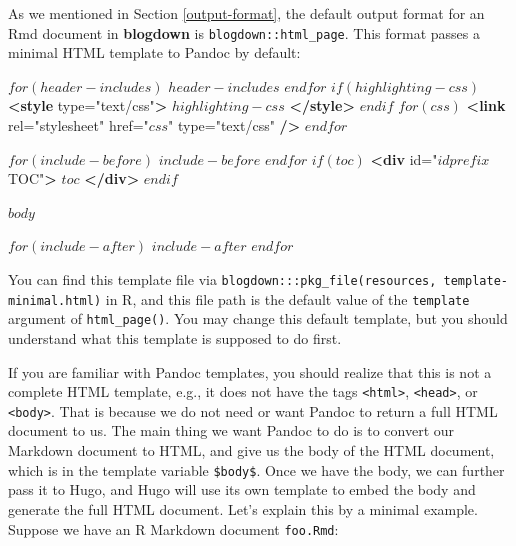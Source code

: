 \documentclass[12pt,]{krantz}
\makeatletter
\newenvironment{Shaded}{\begin{snugshade}}{\end{snugshade}}
\newcommand{\KeywordTok}[1]{\textcolor[rgb]{0.13,0.29,0.53}{\textbf{#1}}}
\newcommand{\StringTok}[1]{\textcolor[rgb]{0.31,0.60,0.02}{#1}}
\newcommand{\OtherTok}[1]{\textcolor[rgb]{0.56,0.35,0.01}{#1}}
\newcommand{\NormalTok}[1]{#1}
\newenvironment{kframe}{%
\medskip{}
\setlength{\fboxsep}{.8em}
 \def\at@end@of@kframe{}%
 \ifinner\ifhmode%
  \def\at@end@of@kframe{\end{minipage}}%
  \begin{minipage}{\columnwidth}%
 \fi\fi%
 \def\FrameCommand##1{\hskip\@totalleftmargin \hskip-\fboxsep
 \colorbox{shadecolor}{##1}\hskip-\fboxsep
     \hskip-\linewidth \hskip-\@totalleftmargin \hskip\columnwidth}%
 \MakeFramed {\advance\hsize-\width
   \@totalleftmargin\z@ \linewidth\hsize
   \@setminipage}}%
 {\par\unskip\endMakeFramed%
 \at@end@of@kframe}
\renewenvironment{Shaded}{\begin{kframe}}{\end{kframe}}
\theoremstyle{definition}
\theoremstyle{definition}
\theoremstyle{definition}
\theoremstyle{remark}
\makeatother
\begin{document}
As we mentioned in Section \ref{output-format}, the default output
format for an Rmd document in \textbf{blogdown} is
\texttt{blogdown::html\_page}. This format passes a minimal HTML
template to Pandoc by default:

\begin{Shaded}
\begin{Highlighting}[]
\NormalTok{$for(header-includes)$}
\NormalTok{$header-includes$}
\NormalTok{$endfor$}
\NormalTok{$if(highlighting-css)$}
\KeywordTok{<style}\OtherTok{ type=}\StringTok{"text/css"}\KeywordTok{>}
\NormalTok{$highlighting-css$}
\KeywordTok{</style>}
\NormalTok{$endif$}
\NormalTok{$for(css)$}
  \KeywordTok{<link}\OtherTok{ rel=}\StringTok{"stylesheet"}\OtherTok{ href=}\StringTok{"$css$"}\OtherTok{ type=}\StringTok{"text/css"} \KeywordTok{/>}
\NormalTok{$endfor$}

\NormalTok{$for(include-before)$}
\NormalTok{$include-before$}
\NormalTok{$endfor$}
\NormalTok{$if(toc)$}
\KeywordTok{<div}\OtherTok{ id=}\StringTok{"$idprefix$TOC"}\KeywordTok{>}
\NormalTok{$toc$}
\KeywordTok{</div>}
\NormalTok{$endif$}

\NormalTok{$body$}

\NormalTok{$for(include-after)$}
\NormalTok{$include-after$}
\NormalTok{$endfor$}
\end{Highlighting}
\end{Shaded}

You can find this template file via
\texttt{blogdown:::pkg\_file(\textquotesingle{}resources\textquotesingle{},\ \textquotesingle{}template-minimal.html\textquotesingle{})}
in R, and this file path is the default value of the \texttt{template}
argument of \texttt{html\_page()}. You may change this default template,
but you should understand what this template is supposed to do first.

If you are familiar with Pandoc templates, you should realize that this
is not a complete HTML template, e.g., it does not have the tags
\texttt{\textless{}html\textgreater{}},
\texttt{\textless{}head\textgreater{}}, or
\texttt{\textless{}body\textgreater{}}. That is because we do not need
or want Pandoc to return a full HTML document to us. The main thing we
want Pandoc to do is to convert our Markdown document to HTML, and give
us the body of the HTML document, which is in the template variable
\texttt{\$body\$}. Once we have the body, we can further pass it to
Hugo, and Hugo will use its own template to embed the body and generate
the full HTML document. Let's explain this by a minimal example. Suppose
we have an R Markdown document \texttt{foo.Rmd}:
\end{document}
